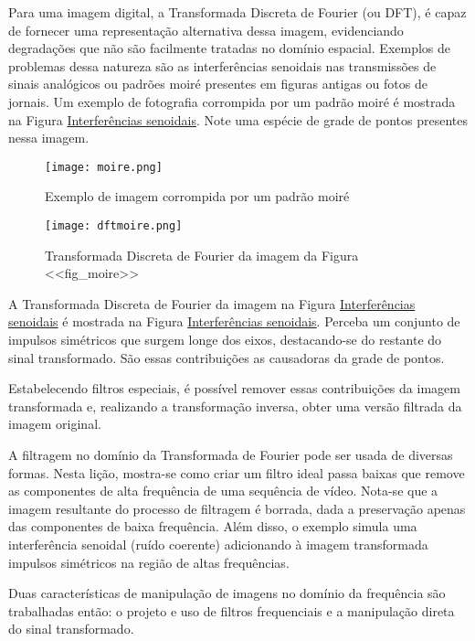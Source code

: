 \documentclass[11pt]{amsbook}
\begin{document}
Para uma imagem digital, a Transformada Discreta de Fourier (ou DFT),
é capaz de fornecer uma representação alternativa dessa imagem,
evidenciando degradações que não são facilmente tratadas no domínio
espacial. Exemplos de problemas dessa natureza são as interferências
senoidais nas transmissões de sinais analógicos ou padrões moiré
presentes em figuras antigas ou fotos de jornais. Um exemplo de
fotografia corrompida por um padrão moiré é mostrada na Figura
\hyperlink{fig-moire}{Interferências senoidais}. Note uma espécie de grade de pontos presentes nessa
imagem.


\begin{figure}[h]{}
\centering\texttt{[image: moire.png]}
\caption{Exemplo de imagem corrompida por um padrão moiré}

\end{figure}

\begin{figure}[h]{}
\centering\texttt{[image: dftmoire.png]}
\caption{Transformada Discreta de Fourier da imagem da Figura <<fig_moire>>}

\end{figure}

A Transformada Discreta de Fourier da imagem na Figura
\hyperlink{fig-dftmoire}{Interferências senoidais} é mostrada na Figura \hyperlink{fig-dftmoire}{Interferências senoidais}. Perceba um
conjunto de impulsos simétricos que surgem longe dos eixos,
destacando-se do restante do sinal transformado. São essas
contribuições as causadoras da grade de pontos.


Estabelecendo filtros especiais, é possível remover essas
contribuições da imagem transformada e, realizando a transformação
inversa, obter uma versão filtrada da imagem original.


A filtragem no domínio da Transformada de Fourier pode ser usada de
diversas formas. Nesta lição, mostra-se como criar um filtro ideal
passa baixas que remove as componentes de alta frequência de uma
sequência de vídeo. Nota-se que a imagem resultante do processo de
filtragem é borrada, dada a preservação apenas das componentes de
baixa frequência. Além disso, o exemplo simula uma interferência
senoidal (ruído coerente) adicionando à imagem transformada impulsos
simétricos na região de altas frequências.


Duas características de manipulação de imagens no domínio da
frequência são trabalhadas então: o projeto e uso de filtros
frequenciais e a manipulação direta do sinal transformado.
\end{document}
